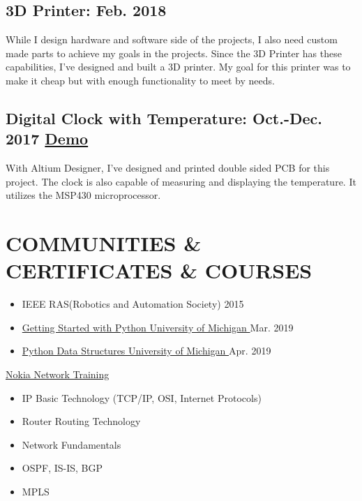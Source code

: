 \documentclass[10pt]{article}
\begin{document}
\subsection{3D Printer: Feb. 2018} 
While I design hardware and software side of the projects, I also need custom made parts to achieve my goals in the projects. Since the 3D Printer has these capabilities, I've designed and built a 3D printer. My goal for this printer was to make it cheap but with enough functionality to meet by needs.

\subsection{Digital Clock with Temperature: Oct.-Dec. 2017 \textcolor{Mycolor3}{\href{https://github.com/Zrrck/Digital-Clock-with-Teperature-Display}{}}
\textcolor{Mycolor2}{\href{https://youtu.be/F9gKzfekm9k}{\small {Demo}}} }
With Altium Designer, I've designed and printed double sided PCB for this project. The clock is also capable of measuring and displaying the temperature. It utilizes the MSP430 microprocessor.




\section{COMMUNITIES \& CERTIFICATES \& COURSES}


\justifying

\begin{itemize}
\justifying
\itemsep0em
\item IEEE RAS(Robotics and Automation Society)  2015 


\item \textcolor{Mycolor5}{\href{https://www.coursera.org/account/accomplishments/certificate/8VLTSNMH2832}{Getting Started with Python University of Michigan }}
Mar. 2019 

 \item \textcolor{Mycolor5}{\href{https://www.coursera.org/account/accomplishments/certificate/X7QKJD4ASQQD}{Python Data Structures University of Michigan }}
 Apr. 2019 

\end{itemize}

\underline{Nokia Network Training}  

   \begin{itemize}
 \justifying
   
\itemsep0em
\item IP Basic Technology (TCP/IP, OSI, Internet Protocols)

\item     Router Routing Technology
 \item    Network Fundamentals
 \item    OSPF, IS-IS, BGP
\item     MPLS

\end{itemize} 
\end{document}
